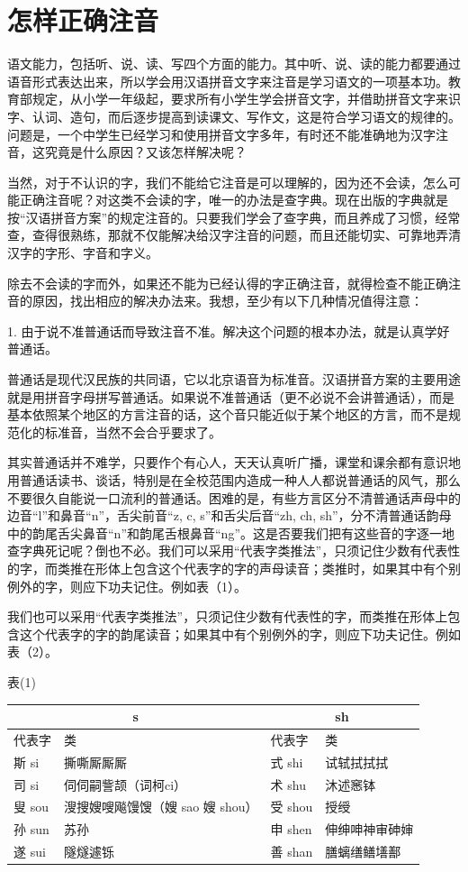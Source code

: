 \section{怎样正确注音}

语文能力，包括听、说、读、写四个方面的能力。其中听、说、读的能力都要通过语音形式表达出来，所以学会用汉语拼音文字来注音是学习语文的一项基本功。教育部规定，从小学一年级起，要求所有小学生学会拼音文字，并借助拼音文字来识字、认词、造句，而后逐步提高到读课文、写作文，这是符合学习语文的规律的。问题是，一个中学生已经学习和使用拼音文字多年，有时还不能准确地为汉字注音，这究竟是什么原因？又该怎样解决呢？

当然，对于不认识的字，我们不能给它注音是可以理解的，因为还不会读，怎么可能正确注音呢？对这类不会读的字，唯一的办法是查字典。现在出版的字典就是按“汉语拼音方案”的规定注音的。只要我们学会了查字典，而且养成了习惯，经常查，查得很熟练，那就不仅能解决给汉字注音的问题，而且还能切实、可靠地弄清汉字的字形、字音和字义。

除去不会读的字而外，如果还不能为已经认得的字正确注音，就得检查不能正确注音的原因，找出相应的解决办法来。我想，至少有以下几种情况值得注意：

1. 由于说不准普通话而导致注音不准。解决这个问题的根本办法，就是认真学好普通话。

普通话是现代汉民族的共同语，它以北京语音为标准音。汉语拼音方案的主要用途就是用拼音字母拼写普通话。如果说不准普通话（更不必说不会讲普通话），而是基本依照某个地区的方言注音的话，这个音只能近似于某个地区的方言，而不是规范化的标准音，当然不会合乎要求了。
\newpage

其实普通话并不难学，只要作个有心人，天天认真听广播，课堂和课余都有意识地用普通话读书、谈话，特别是在全校范围内造成一种人人都说普通话的风气，那么不要很久自能说一口流利的普通话。困难的是，有些方言区分不清普通话声母中的边音“l”和鼻音“n”，舌尖前音“z, c, s”和舌尖后音“zh, ch, sh”，分不清普通话韵母中的韵尾舌尖鼻音“n”和韵尾舌根鼻音“ng”。这是否要我们把有这些音的字逐一地查字典死记呢？倒也不必。我们可以采用“代表字类推法”，只须记住少数有代表性的字，而类推在形体上包含这个代表字的字的声母读音；类推时，如果其中有个别例外的字，则应下功夫记住。例如表（1）。

我们也可以采用“代表字类推法”，只须记住少数有代表性的字，而类推在形体上包含这个代表字的字的韵尾读音；如果其中有个别例外的字，则应下功夫记住。例如表（2）。

表(1)

\noindent
\begin{tabular}{|p{3em}|p{8em}|p{4em}|p{7em}|}
\hline
\multicolumn{2}{|c|}{s} & \multicolumn{2}{|c|}{sh}\\
\hline
代表字 & 类 & 代表字 & 类\\
\hline
斯 si & 撕嘶厮厮厮 & 式 shi & 试轼拭拭拭\\
\hline
司 si   & 伺伺嗣訾颉（词柯ci） & 术 shu & 沐述窸钵\\
\hline
叟 sou	& 溲搜嫂嗖飚馒馊（嫂 sao 嫂 shou） & 受 shou & 授绶\\
\hline
孙 sun	& 苏孙 & 申 shen & 伸绅呻神审砷婶\\
\hline
遂 sui	& 隧燧遽铄 & 善 shan & 膳螭缮鳝墡鄯\\
\hline
\end{tabular}
\newpage

